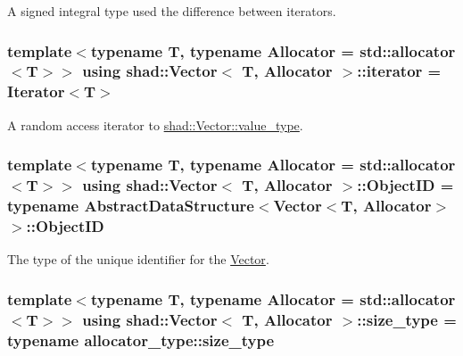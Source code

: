 A signed integral type used the difference between iterators. 

\hypertarget{classshad_1_1Vector_aaa71fd41daa1548f8436bc54ef507976}{
\subsubsection[{iterator}]{\setlength{\rightskip}{0pt plus 5cm}template$<$typename T, typename Allocator = std\-::allocator$<$\-T$>$$>$ using {\bf shad\-::\-Vector}$<$ T, Allocator $>$\-::{\bf iterator} =  Iterator$<$T$>$}}\label{classshad_1_1Vector_aaa71fd41daa1548f8436bc54ef507976}


A random access iterator to \hyperlink{classshad_1_1Vector_adb97b89826617473f44b4bb1dd3308ba}{shad\-::\-Vector\-::value\-\_\-type}. 

\hypertarget{classshad_1_1Vector_a71193856f7dddb5e9fe0128fe5d12448}{
\subsubsection[{Object\-I\-D}]{\setlength{\rightskip}{0pt plus 5cm}template$<$typename T, typename Allocator = std\-::allocator$<$\-T$>$$>$ using {\bf shad\-::\-Vector}$<$ T, Allocator $>$\-::{\bf Object\-I\-D} =  typename {\bf Abstract\-Data\-Structure}$<${\bf Vector}$<$T, Allocator$>$$>$\-::{\bf Object\-I\-D}}}\label{classshad_1_1Vector_a71193856f7dddb5e9fe0128fe5d12448}


The type of the unique identifier for the \hyperlink{classshad_1_1Vector}{Vector}. 

\hypertarget{classshad_1_1Vector_a1c97f4eb87d738cb4de97e5b3587c397}{
\subsubsection[{size\-\_\-type}]{\setlength{\rightskip}{0pt plus 5cm}template$<$typename T, typename Allocator = std\-::allocator$<$\-T$>$$>$ using {\bf shad\-::\-Vector}$<$ T, Allocator $>$\-::{\bf size\-\_\-type} =  typename allocator\-\_\-type\-::size\-\_\-type}}\label{classshad_1_1Vector_a1c97f4eb87d738cb4de97e5b3587c397}


